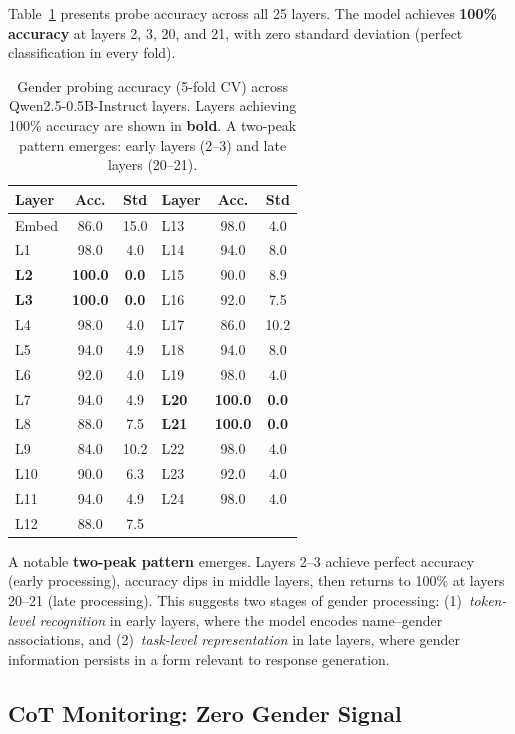 \documentclass[11pt]{article}
\begin{document}
Table~\ref{tab:probing} presents probe accuracy across all 25 layers. The model achieves \textbf{100\% accuracy} at layers 2, 3, 20, and 21, with zero standard deviation (perfect classification in every fold).

\begin{table}[t]
\centering
\small
\caption{Gender probing accuracy (5-fold CV) across Qwen2.5-0.5B-Instruct layers. Layers achieving 100\% accuracy are shown in \textbf{bold}. A two-peak pattern emerges: early layers (2--3) and late layers (20--21).}
\label{tab:probing}
\begin{tabular}{lcc|lcc}
\toprule
\textbf{Layer} & \textbf{Acc.} & \textbf{Std} & \textbf{Layer} & \textbf{Acc.} & \textbf{Std} \\
\midrule
Embed & 86.0 & 15.0 & L13 & 98.0 & 4.0 \\
L1 & 98.0 & 4.0 & L14 & 94.0 & 8.0 \\
\textbf{L2} & \textbf{100.0} & \textbf{0.0} & L15 & 90.0 & 8.9 \\
\textbf{L3} & \textbf{100.0} & \textbf{0.0} & L16 & 92.0 & 7.5 \\
L4 & 98.0 & 4.0 & L17 & 86.0 & 10.2 \\
L5 & 94.0 & 4.9 & L18 & 94.0 & 8.0 \\
L6 & 92.0 & 4.0 & L19 & 98.0 & 4.0 \\
L7 & 94.0 & 4.9 & \textbf{L20} & \textbf{100.0} & \textbf{0.0} \\
L8 & 88.0 & 7.5 & \textbf{L21} & \textbf{100.0} & \textbf{0.0} \\
L9 & 84.0 & 10.2 & L22 & 98.0 & 4.0 \\
L10 & 90.0 & 6.3 & L23 & 92.0 & 4.0 \\
L11 & 94.0 & 4.9 & L24 & 98.0 & 4.0 \\
L12 & 88.0 & 7.5 & & & \\
\bottomrule
\end{tabular}
\end{table}

A notable \textbf{two-peak pattern} emerges. Layers 2--3 achieve perfect accuracy (early processing), accuracy dips in middle layers, then returns to 100\% at layers 20--21 (late processing). This suggests two stages of gender processing: (1)~\emph{token-level recognition} in early layers, where the model encodes name--gender associations, and (2)~\emph{task-level representation} in late layers, where gender information persists in a form relevant to response generation.

\subsection{CoT Monitoring: Zero Gender Signal}
\end{document}
